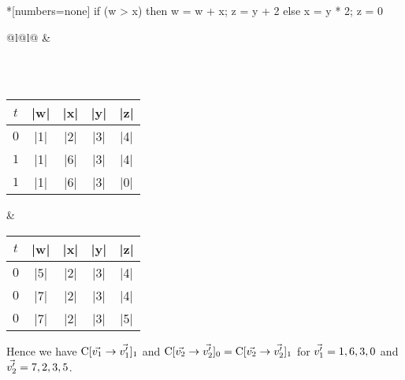 \newsavebox\ifconectwoo
\begin{lrbox}{\ifconectwoo}
\begin{minipage}{4cm}
\begin{whilelisting}*[numbers=none]
if (w > x) then
  w = w + x;
  z = y + 2
else
  x = y * 2;
  z = 0
\end{whilelisting}
\end{minipage}
\end{lrbox}

\noindent%
\begin{tabularx}{\textwidth}{@{}l@{\hspace{2em}}l@{}}
\usebox\ifconectwoo &
\begin{tikzpicture}[baseline = 30pt, anchor=base, node distance=1cm]
\node (x) {\(\lvl{\prc|x|}\)};
\node (w) [above left  = .45cm and .08cm of x] {\(\lvl{\prc|w|}\)};
\node (y) [above right = .45cm and .08cm of x] {\(\lvl{\prc|y|}\)};
\node (z) [above right = .45cm and .08cm of w] {\(\lvl{\prc|z|}\)};
\draw[->] (x) -- (w);
\draw[->] (x) -- (y);
\draw[->] (w) -- (z);
\draw[->] (y) -- (z);
\begin{scope}[on background layer]
\node [fill=fillcolor, fit=(y), rounded corners=.3cm, inner sep=1pt, draw=fillborder] {};
\end{scope}
\end{tikzpicture}
\\ \\
\begin{tabular}{c || c >{\columncolor{fillcolor}}c >{\columncolor{fillcolor}}c c }
$t$ & \prc|w| & \prc|x| & \prc|y| & \prc|z| \\ \hline \hline
$0$ & \prc|1| & \prc|2| & \prc|3| & \prc|4| \\ \hline
$1$ & \prc|1| & \prc|6| & \prc|3| & \prc|4| \\
$1$ & \prc|1| & \prc|6| & \prc|3| & \prc|0|
\end{tabular}
&
\begin{tabular}{c || c >{\columncolor{fillcolor}}c >{\columncolor{fillcolor}}c c }
$t$ & \prc|w| & \prc|x| & \prc|y| & \prc|z| \\ \hline \hline
$0$ & \prc|5| & \prc|2| & \prc|3| & \prc|4| \\ \hline
$0$ & \prc|7| & \prc|2| & \prc|3| & \prc|4| \\
$0$ & \prc|7| & \prc|2| & \prc|3| & \prc|5|
\end{tabular}
\end{tabularx}

\noindent Hence we have \(\prc|C|[\vec{v_1} \rightarrow \vec{v_1'}]_1\) and
\(\prc|C|[\vec{v_2} \rightarrow \vec{v_2'}]_0 = \prc|C|[\vec{v_2} \rightarrow
\vec{v_2'}]_1\) for \(\vec{v_1'} = \prc|1|, \prc|6|, \prc|3|, \prc|0|\) and
\(\vec{v_2'} = \prc|7|, \prc|2|, \prc|3|, \prc|5|\).

